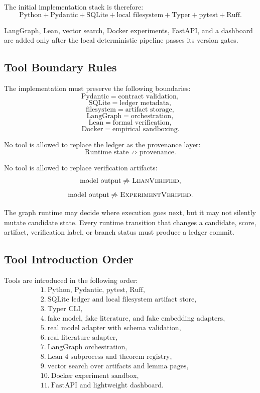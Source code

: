 \documentclass[11pt]{article}
\begin{document}
The initial implementation stack is therefore:
$$
\text{Python} + \text{Pydantic} + \text{SQLite} + \text{local filesystem} + \text{Typer} + \text{pytest} + \text{Ruff}.
$$

LangGraph, Lean, vector search, Docker experiments, FastAPI, and a dashboard are added only after the local deterministic pipeline passes its version gates.

\subsection{Tool Boundary Rules}

The implementation must preserve the following boundaries:
$$
\text{Pydantic}=\text{contract validation},
$$
$$
\text{SQLite}=\text{ledger metadata},
$$
$$
\text{filesystem}=\text{artifact storage},
$$
$$
\text{LangGraph}=\text{orchestration},
$$
$$
\text{Lean}=\text{formal verification},
$$
$$
\text{Docker}=\text{empirical sandboxing}.
$$

No tool is allowed to replace the ledger as the provenance layer:
$$
\text{Runtime state} \not\Rightarrow \text{provenance}.
$$

No tool is allowed to replace verification artifacts:
$$
\text{model output} \not\Rightarrow \textsc{LeanVerified},
$$
$$
\text{model output} \not\Rightarrow \textsc{ExperimentVerified}.
$$

The graph runtime may decide where execution goes next, but it may not silently mutate candidate state. Every runtime transition that changes a candidate, score, artifact, verification label, or branch status must produce a ledger commit.

\subsection{Tool Introduction Order}

Tools are introduced in the following order:
$$
\begin{aligned}
&1.\ \text{Python, Pydantic, pytest, Ruff},\\
&2.\ \text{SQLite ledger and local filesystem artifact store},\\
&3.\ \text{Typer CLI},\\
&4.\ \text{fake model, fake literature, and fake embedding adapters},\\
&5.\ \text{real model adapter with schema validation},\\
&6.\ \text{real literature adapter},\\
&7.\ \text{LangGraph orchestration},\\
&8.\ \text{Lean 4 subprocess and theorem registry},\\
&9.\ \text{vector search over artifacts and lemma pages},\\
&10.\ \text{Docker experiment sandbox},\\
&11.\ \text{FastAPI and lightweight dashboard}.
\end{aligned}
$$
\end{document}
